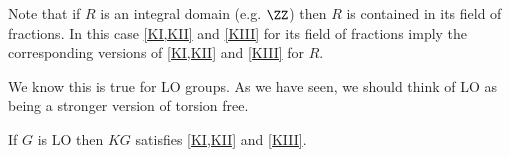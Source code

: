 
\begin{rmk}
Note that if $R$ is an integral domain (e.g. $\ZZ$) then $R$ is contained in its field of
fractions. In this case 
\cref{KI,KII} and \cref{KIII} 
for its field of fractions imply the corresponding versions of
\cref{KI,KII} and \cref{KIII} for $R$.
\end{rmk}
\begin{rmk}
We know this is true for LO groups. 
As we have seen,
we should think of LO as being a stronger version of torsion free.
\end{rmk}

\begin{thm}
If $G$ is LO then $KG$ satisfies
\cref{KI,KII} and \cref{KIII}.
\label{thm:1.23}
\end{thm}

